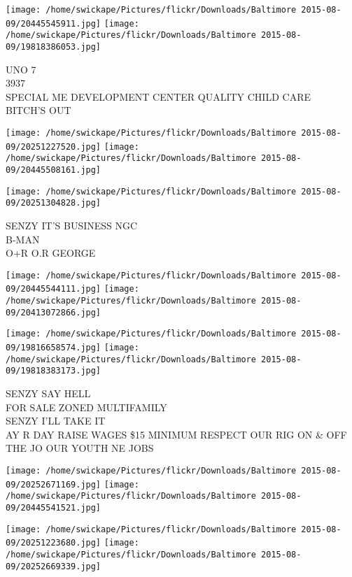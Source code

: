 \documentclass[10pt,letterpaper]{article}
\begin{document}
\texttt{[image: /home/swickape/Pictures/flickr/Downloads/Baltimore 2015-08-09/20445545911.jpg]}
\texttt{[image: /home/swickape/Pictures/flickr/Downloads/Baltimore 2015-08-09/19818386053.jpg]}

UNO 7\\
3937\\
SPECIAL ME DEVELOPMENT CENTER QUALITY CHILD CARE\\
BITCH'S OUT\\
\pagebreak

\texttt{[image: /home/swickape/Pictures/flickr/Downloads/Baltimore 2015-08-09/20251227520.jpg]}
\texttt{[image: /home/swickape/Pictures/flickr/Downloads/Baltimore 2015-08-09/20445508161.jpg]}

\vspace{0.25in}
\texttt{[image: /home/swickape/Pictures/flickr/Downloads/Baltimore 2015-08-09/20251304828.jpg]}

SENZY IT'S BUSINESS NGC\\
B{-}MAN\\
O+R O.R GEORGE\\
\pagebreak

\texttt{[image: /home/swickape/Pictures/flickr/Downloads/Baltimore 2015-08-09/20445544111.jpg]}
\texttt{[image: /home/swickape/Pictures/flickr/Downloads/Baltimore 2015-08-09/20413072866.jpg]}

\texttt{[image: /home/swickape/Pictures/flickr/Downloads/Baltimore 2015-08-09/19816658574.jpg]}
\texttt{[image: /home/swickape/Pictures/flickr/Downloads/Baltimore 2015-08-09/19818383173.jpg]}

SENZY SAY HELL\\
FOR SALE ZONED MULTIFAMILY\\
SENZY I'LL TAKE IT\\
AY R DAY RAISE WAGES \$15 MINIMUM RESPECT OUR RIG ON \& OFF THE JO OUR YOUTH NE JOBS\\
\pagebreak

\texttt{[image: /home/swickape/Pictures/flickr/Downloads/Baltimore 2015-08-09/20252671169.jpg]}
\texttt{[image: /home/swickape/Pictures/flickr/Downloads/Baltimore 2015-08-09/20445541521.jpg]}

\texttt{[image: /home/swickape/Pictures/flickr/Downloads/Baltimore 2015-08-09/20251223680.jpg]}
\texttt{[image: /home/swickape/Pictures/flickr/Downloads/Baltimore 2015-08-09/20252669339.jpg]}
\end{document}
